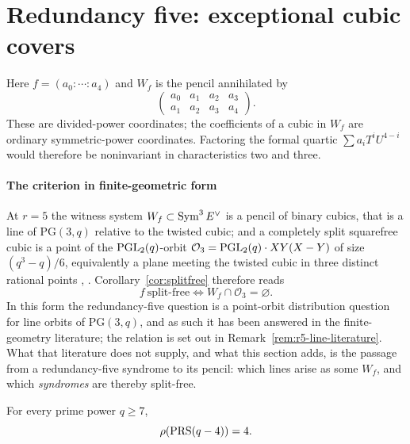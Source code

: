 \section{Redundancy five: exceptional cubic covers}\label{sec:r5}

Here $f=(a_0:\cdots:a_4)$ and $W_f$ is the pencil annihilated by
\[
 \begin{pmatrix}a_0&a_1&a_2&a_3\\a_1&a_2&a_3&a_4\end{pmatrix}.
\]
These are divided-power coordinates; the coefficients of a cubic in
$W_f$ are ordinary symmetric-power coordinates.  Factoring the formal
quartic $\sum a_iT^iU^{4-i}$ would therefore be noninvariant in
characteristics two and three.

\paragraph{The criterion in finite-geometric form}
At $r=5$ the witness system $W_f\subset\operatorname{Sym}^3E^\vee$ is a pencil of
binary cubics, that is a line of $\mathrm{PG}(3,q)$ relative to the twisted
cubic; and a completely split squarefree cubic is a point of the
$\operatorname{PGL}_2(q)$-orbit $\mathcal O_3=\operatorname{PGL}_2(q)\cdot XY(X-Y)$ of size
$(q^3-q)/6$, equivalently a plane meeting the twisted cubic in three
distinct rational points \cite[Prop.~4.1 and Rem.~4.2]{BPS2022},
\cite[Lem.~4.1]{KaipaPradhan2025}.  Corollary~\ref{cor:splitfree}
therefore reads
\begin{equation}\label{eq:r5-orbit-criterion}
       f\ \text{split-free}
       \iff
       W_f\cap\mathcal O_3=\varnothing .
\end{equation}
In this form the redundancy-five question is a point-orbit
distribution question for line orbits of $\mathrm{PG}(3,q)$, and as such it has
been answered in the finite-geometry literature; the relation is set
out in Remark~\ref{rem:r5-line-literature}.  What that literature does
not supply, and what this section adds, is the passage from a
redundancy-five syndrome to its pencil: which lines arise as some
$W_f$, and which \emph{syndromes} are thereby split-free.

\begin{proposition}\label{prop:r5-radius}%
%
%
%
For every prime power $q\geq7$,
\[
       \rho(\operatorname{PRS}(q-4))=4.
\]
\end{proposition}

